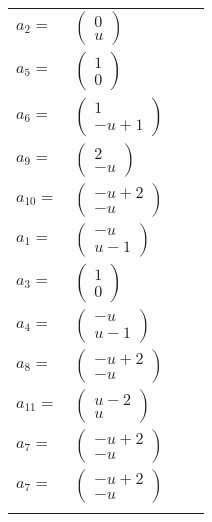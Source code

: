 \documentclass[1p]{elsarticle_modified}
\theoremstyle{definition}
\begin{document}
\begin{tabular}{m{7pt} m{180pt} m{7pt} m{180pt} }
\flushright $a_{2}=$&$\begin{pmatrix}0\\u\end{pmatrix}$ \\
\flushright $a_{5}=$&$\begin{pmatrix}1\\0\end{pmatrix}$ \\
\flushright $a_{6}=$&$\begin{pmatrix}1\\- u+1\end{pmatrix}$ \\
\flushright $a_{9}=$&$\begin{pmatrix}2\\- u\end{pmatrix}$ \\
\flushright $a_{10}=$&$\begin{pmatrix}- u+2\\- u\end{pmatrix}$ \\
\flushright $a_{1}=$&$\begin{pmatrix}- u\\u-1\end{pmatrix}$ \\
\flushright $a_{3}=$&$\begin{pmatrix}1\\0\end{pmatrix}$ \\
\flushright $a_{4}=$&$\begin{pmatrix}- u\\u-1\end{pmatrix}$ \\
\flushright $a_{8}=$&$\begin{pmatrix}- u+2\\- u\end{pmatrix}$ \\
\flushright $a_{11}=$&$\begin{pmatrix}u-2\\u\end{pmatrix}$ \\
\flushright $a_{7}=$&$\begin{pmatrix}- u+2\\- u\end{pmatrix}$\\ \flushright $a_{7}=$&$\begin{pmatrix}- u+2\\- u\end{pmatrix}$\\&\end{tabular}
\end{document}
